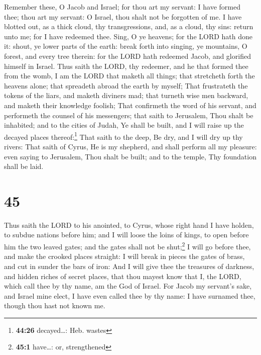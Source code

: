  Remember these, O Jacob and Israel; for thou art my
servant: I have formed thee; thou art my servant: O Israel, thou shalt
not be forgotten of me.  I have blotted out, as a thick
cloud, thy transgressions, and, as a cloud, thy sins: return unto me;
for I have redeemed thee.  Sing, O ye heavens; for the
LORD hath done it: shout, ye lower parts of the earth: break forth into
singing, ye mountains, O forest, and every tree therein: for the LORD
hath redeemed Jacob, and glorified himself in Israel. 
Thus saith the LORD, thy redeemer, and he that formed thee from the
womb, I am the LORD that maketh all things; that stretcheth forth the
heavens alone; that spreadeth abroad the earth by myself;
 That frustrateth the tokens of the liars, and maketh
diviners mad; that turneth wise men backward, and maketh their knowledge
foolish;  That confirmeth the word of his servant, and
performeth the counsel of his messengers; that saith to Jerusalem, Thou
shalt be inhabited; and to the cities of Judah, Ye shall be built, and I
will raise up the decayed places thereof:\footnote{\textbf{44:26}
  decayed\ldots: Heb. wastes}  That saith to the deep, Be
dry, and I will dry up thy rivers:  That saith of Cyrus,
He is my shepherd, and shall perform all my pleasure: even saying to
Jerusalem, Thou shalt be built; and to the temple, Thy foundation shall
be laid.

\hypertarget{section-44}{%
\section{45}\label{section-44}}

 Thus saith the LORD to his anointed, to Cyrus, whose
right hand I have holden, to subdue nations before him; and I will loose
the loins of kings, to open before him the two leaved gates; and the
gates shall not be shut;\footnote{\textbf{45:1} have\ldots: or,
  strengthened}  I will go before thee, and make the
crooked places straight: I will break in pieces the gates of brass, and
cut in sunder the bars of iron:  And I will give thee the
treasures of darkness, and hidden riches of secret places, that thou
mayest know that I, the LORD, which call thee by thy name, am the God of
Israel.  For Jacob my servant's sake, and Israel mine
elect, I have even called thee by thy name: I have surnamed thee, though
thou hast not known me.

